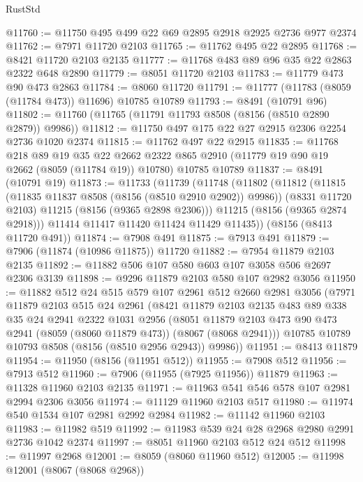 \begin{lexlean}{RustStd}
\begin{coremodule}
@11760 := @11750 @495 @499 @22 @69 @2895 @2918 @2925 @2736 @977 @2374
@11762 := @7971 @11720 @2103
@11765 := @11762 @495 @22 @2895
@11768 := @8421 @11720 @2103 @2135
@11777 := @11768 @483 @89 @96 @35 @22 @2863 @2322 @648 @2890
@11779 := @8051 @11720 @2103
@11783 := @11779 @473 @90 @473 @2863
@11784 := @8060 @11720
@11791 := @11777 (@11783 (@8059 (@11784 @473)) @11696) @10785 @10789
@11793 := @8491 (@10791 @96)
@11802 := @11760 (@11765 (@11791 @11793 @8508 (@8156 (@8510 @2890 @2879)) @9986))
@11812 := @11750 @497 @175 @22 @27 @2915 @2306 @2254 @2736 @1020 @2374
@11815 := @11762 @497 @22 @2915
@11835 := @11768
    @218
    @89
    @19
    @35
    @22
    @2662
    @2322
    @865
    @2910
    (@11779 @19 @90 @19 @2662 (@8059 (@11784 @19)) @10780)
    @10785
    @10789
@11837 := @8491 (@10791 @19)
@11873 := @11733
    (@11739
      (@11748
        (@11802
          (@11812
            (@11815 (@11835 @11837 @8508 (@8156 (@8510 @2910 @2902)) @9986))
            (@8331 @11720 @2103)
            @11215
            (@8156 (@9365 @2898 @2306)))
          @11215
          (@8156 (@9365 @2874 @2918)))
        @11414
        @11417
        @11420
        @11424
        @11429
        @11435))
    (@8156 (@8413 @11720 @491))
@11874 := @7908 @491
@11875 := @7913 @491
@11879 := @7906 (@11874 (@10986 @11875)) @11720
@11882 := @7954 @11879 @2103 @2135
@11892 := @11882 @506 @107 @580 @603 @107 @3058 @506 @2697 @2306 @3139
@11898 := @9296 @11879 @2103 @580 @107 @2982 @3056
@11950 := @11882
    @512
    @24
    @515
    @579
    @107
    @2961
    @512
    @2660
    @2981
    @3056
    (@7971
      @11879
      @2103
      @515
      @24
      @2961
      (@8421
        @11879
        @2103
        @2135
        @483
        @89
        @338
        @35
        @24
        @2941
        @2322
        @1031
        @2956
        (@8051 @11879 @2103 @473 @90 @473 @2941 (@8059 (@8060 @11879 @473)) (@8067 (@8068 @2941)))
        @10785
        @10789
        @10793
        @8508
        (@8156 (@8510 @2956 @2943))
        @9986))
@11951 := @8413 @11879
@11954 := @11950 (@8156 (@11951 @512))
@11955 := @7908 @512
@11956 := @7913 @512
@11960 := @7906 (@11955 (@7925 @11956)) @11879
@11963 := @11328 @11960 @2103 @2135
@11971 := @11963 @541 @546 @578 @107 @2981 @2994 @2306 @3056
@11974 := @11129 @11960 @2103 @517
@11980 := @11974 @540 @1534 @107 @2981 @2992 @2984
@11982 := @11142 @11960 @2103
@11983 := @11982 @519
@11992 := @11983 @539 @24 @28 @2968 @2980 @2991 @2736 @1042 @2374
@11997 := @8051 @11960 @2103 @512 @24 @512
@11998 := @11997 @2968
@12001 := @8059 (@8060 @11960 @512)
@12005 := @11998 @12001 (@8067 (@8068 @2968))

\end{coremodule}
\end{lexlean}
